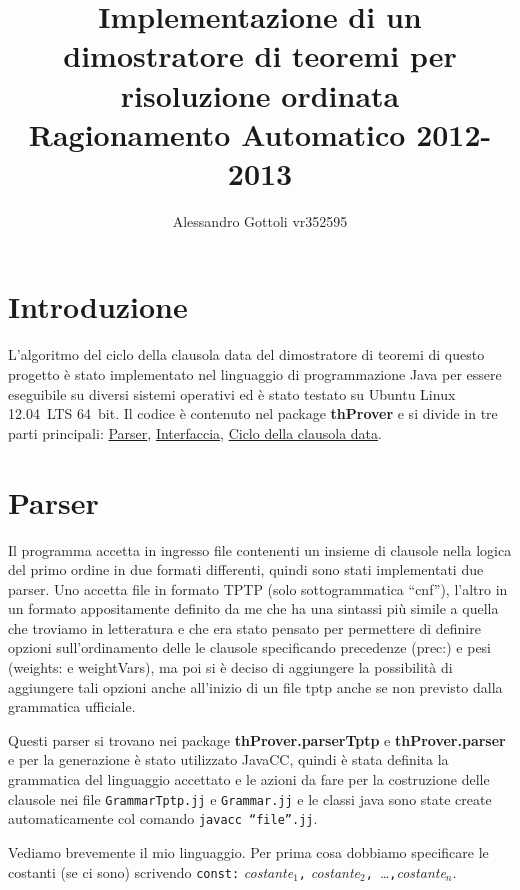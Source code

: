 \documentclass[a4paper,11pt]{article} %
\newcommand{\sintassi}{\texttt}
\newcommand{\file}{\texttt}
\newcommand{\package}{\textbf}
\newcommand{\com}{\texttt}
\begin{document}
\title{Implementazione di un dimostratore di teoremi per risoluzione ordinata \\
       Ragionamento Automatico 2012-2013}
\author{Alessandro Gottoli vr352595}
\maketitle

\section*{Introduzione}
L'algoritmo del ciclo della clausola data del dimostratore di teoremi
di questo progetto è stato implementato nel linguaggio di 
programmazione Java per essere eseguibile su diversi sistemi
operativi ed è stato testato su Ubuntu Linux 12.04~LTS 64~bit.
Il codice è contenuto nel package \package{thProver} e si divide in tre parti
principali: \hyperref[sec: parser]{Parser}, \hyperref[sec: interfaccia]{Interfaccia},
\hyperref[sec: ciclo]{Ciclo della clausola data}.

\section{Parser}\label{sec: parser}
Il programma accetta in ingresso file contenenti un insieme di clausole nella logica
del primo ordine in due formati differenti, quindi sono
stati implementati due parser. %
Uno accetta file in formato TPTP (solo sottogrammatica ``cnf''), l'altro
in un formato appositamente definito da me che ha una sintassi più simile a 
quella che troviamo in letteratura e che era stato pensato per permettere 
di definire opzioni
sull'ordinamento delle le clausole specificando precedenze (prec:) 
e pesi (weights: e weightVars), ma poi si è
deciso di aggiungere la possibilità di aggiungere tali opzioni anche all'inizio
di un file tptp anche se non previsto dalla grammatica ufficiale.
 
Questi parser si trovano nei package \package{thProver.parserTptp} e 
\package{thProver.parser} e per la generazione è stato utilizzato JavaCC, 
quindi è stata definita
la grammatica del linguaggio accettato e le azioni da fare per la costruzione
delle clausole nei file \file{GrammarTptp.jj} e \file{Grammar.jj} e le classi
java sono state create automaticamente col comando \com{javacc ``file''.jj}.

Vediamo brevemente il mio linguaggio. 
Per prima cosa dobbiamo specificare le costanti (se ci sono) scrivendo
\sintassi{const:} \emph{costante$_{1}$}\sintassi{,}
\emph{costante$_{2}$}\sintassi{,}~\ldots\sintassi{,}\emph{costante$_{n}$}.
\end{document}
